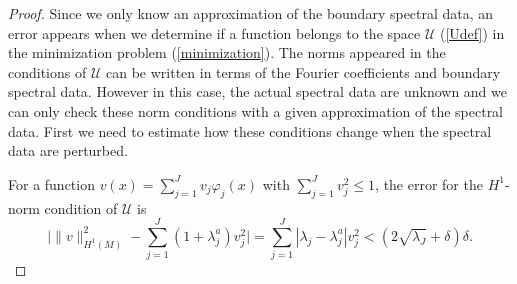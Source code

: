 \documentclass[11pt,letterpaper]{amsart}
\numberwithin{equation}{section}
\theoremstyle{definition}
\theoremstyle{plain}
\theoremstyle{definition}
\theoremstyle{plain}
\theoremstyle{definition}
\theoremstyle{plain}
\begin{document}
\begin{proof}
Since we only know an approximation of the boundary spectral data, an error appears when we determine if a function belongs to the space $\mathcal{U}$ (\ref{Udef}) in the minimization problem (\ref{minimization}). The norms appeared in the conditions of $\mathcal{U}$ can be written in terms of the Fourier coefficients and boundary spectral data. However in this case, the actual spectral data are unknown and we can only check these norm conditions with a given approximation of the spectral data. First we need to estimate how these conditions change when the spectral data are perturbed. 

For a function $v(x)=\sum_{j=1}^{J}v_j\varphi_j(x)$ with $\sum_{j=1}^{J}v_j^2\leqslant 1$, the error for the $H^1$-norm condition of $\mathcal{U}$ is
\begin{equation}\label{H1error}
\Big|\|v\|^2_{H^1(M)}- \sum_{j=1}^{J} (1+\lambda_j^a)v_j^2\Big| =\sum_{j=1}^{J}|\lambda_j-\lambda_j^a| v_j^2 < (2\sqrt{\lambda_J}+\delta)\delta.
\end{equation}


\end{proof}
\end{document}
